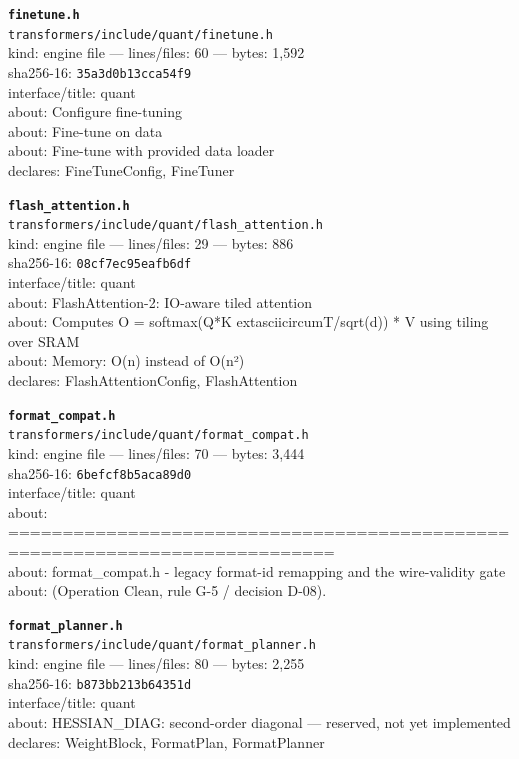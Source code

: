 \noindent\textbf{\texttt{finetune.h}}\\
\texttt{transformers/include/quant/finetune.h}\\
kind: engine file --- lines/files: 60 --- bytes: 1,592\\
sha256-16: \texttt{35a3d0b13cca54f9}\\
interface/title: quant\\
about: Configure fine-tuning\\
about: Fine-tune on data\\
about: Fine-tune with provided data loader\\
declares: FineTuneConfig, FineTuner\\
\vspace*{6.0pt}
\newpage

\noindent\textbf{\texttt{flash\_attention.h}}\\
\texttt{transformers/include/quant/flash\_attention.h}\\
kind: engine file --- lines/files: 29 --- bytes: 886\\
sha256-16: \texttt{08cf7ec95eafb6df}\\
interface/title: quant\\
about: FlashAttention-2: IO-aware tiled attention\\
about: Computes O = softmax(Q*K	extasciicircum{}T/sqrt(d)) * V using tiling over SRAM\\
about: Memory: O(n) instead of O(n²)\\
declares: FlashAttentionConfig, FlashAttention\\
\vspace*{6.0pt}

\noindent\textbf{\texttt{format\_compat.h}}\\
\texttt{transformers/include/quant/format\_compat.h}\\
kind: engine file --- lines/files: 70 --- bytes: 3,444\\
sha256-16: \texttt{6befcf8b5aca89d0}\\
interface/title: quant\\
about: ============================================================================\\
about: format\_compat.h - legacy format-id remapping and the wire-validity gate\\
about: (Operation Clean, rule G-5 / decision D-08).\\
\vspace*{6.0pt}

\noindent\textbf{\texttt{format\_planner.h}}\\
\texttt{transformers/include/quant/format\_planner.h}\\
kind: engine file --- lines/files: 80 --- bytes: 2,255\\
sha256-16: \texttt{b873bb213b64351d}\\
interface/title: quant\\
about: HESSIAN\_DIAG: second-order diagonal — reserved, not yet implemented\\
declares: WeightBlock, FormatPlan, FormatPlanner\\
\vspace*{6.0pt}

